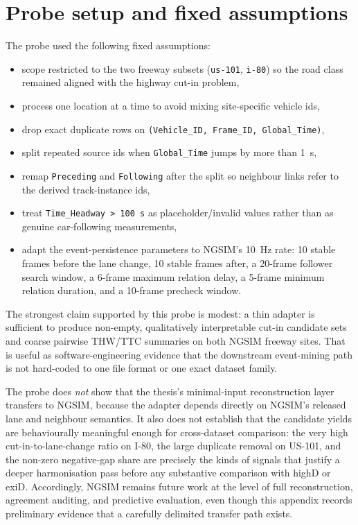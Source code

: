 \documentclass[12pt,a4paper,twoside,openright]{report}
\begin{document}
    \section{Probe setup and fixed assumptions}
    The probe used the following fixed assumptions:
    \begin{itemize}[leftmargin=1.2em]
  \item scope restricted to the two freeway subsets (\texttt{us-101}, \texttt{i-80}) so the road class remained aligned with the highway cut-in problem,
  \item process one location at a time to avoid mixing site-specific vehicle ids,
  \item drop exact duplicate rows on \texttt{(Vehicle\_ID, Frame\_ID, Global\_Time)},
  \item split repeated source ids when \texttt{Global\_Time} jumps by more than \SI{1}{\second},
  \item remap \texttt{Preceding} and \texttt{Following} after the split so neighbour links refer to the derived track-instance ids,
  \item treat \texttt{Time\_Headway > 100\,s} as placeholder/invalid values rather than as genuine car-following measurements,
  \item adapt the event-persistence parameters to NGSIM's \SI{10}{\hertz} rate: 10 stable frames before the lane change, 10 stable frames after, a 20-frame follower search window, a 6-frame maximum relation delay, a 5-frame minimum relation duration, and a 10-frame precheck window.
    \end{itemize}

    The strongest claim supported by this probe is modest: a thin adapter is sufficient to produce non-empty, qualitatively interpretable cut-in candidate sets and coarse pairwise THW/TTC summaries on both NGSIM freeway sites. That is useful as software-engineering evidence that the downstream event-mining path is not hard-coded to one file format or one exact dataset family.

    The probe does \emph{not} show that the thesis's minimal-input reconstruction layer transfers to NGSIM, because the adapter depends directly on NGSIM's released lane and neighbour semantics. It also does not establish that the candidate yields are behaviourally meaningful enough for cross-dataset comparison: the very high cut-in-to-lane-change ratio on I-80, the large duplicate removal on US-101, and the non-zero negative-gap share are precisely the kinds of signals that justify a deeper harmonisation pass before any substantive comparison with highD or exiD. Accordingly, NGSIM remains future work at the level of full reconstruction, agreement auditing, and predictive evaluation, even though this appendix records preliminary evidence that a carefully delimited transfer path exists.
\end{document}
